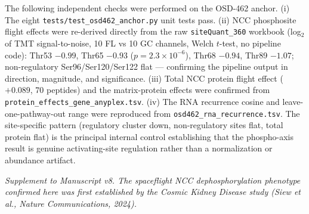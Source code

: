 \documentclass[10pt]{article}
\newcommand{\code}[1]{\texttt{#1}}
\begin{document}
The following independent checks were performed on the OSD-462 anchor. (i) The eight \code{tests/test\_osd462\_anchor.py} unit tests pass. (ii) NCC phosphosite flight effects were re-derived directly from the raw \code{siteQuant\_360} workbook (log$_2$ of TMT signal-to-noise, 10 FL vs 10 GC channels, Welch $t$-test, no pipeline code): Thr53 $-0.99$, Thr65 $-0.93$ ($p=2.3\times10^{-6}$), Thr68 $-0.94$, Thr89 $-1.07$; non-regulatory Ser96/Ser120/Ser122 flat --- confirming the pipeline output in direction, magnitude, and significance. (iii) Total NCC protein flight effect ($+0.089$, 70 peptides) and the matrix-protein effects were confirmed from \code{protein\_effects\_gene\_anyplex.tsv}. (iv) The RNA recurrence cosine and leave-one-pathway-out range were reproduced from \code{osd462\_rna\_recurrence.tsv}. The site-specific pattern (regulatory cluster down, non-regulatory sites flat, total protein flat) is the principal internal control establishing that the phospho-axis result is genuine activating-site regulation rather than a normalization or abundance artifact.

\vspace{1em}
\noindent\itshape Supplement to Manuscript v8. The spaceflight NCC dephosphorylation phenotype confirmed here was first established by the Cosmic Kidney Disease study (Siew et al., \emph{Nature Communications}, 2024).
\end{document}
